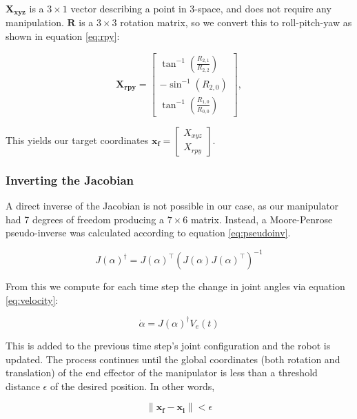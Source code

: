 \documentclass[10pt, conference]{IEEEtran}
\begin{document}
    \(\mathbf{X_{xyz}}\) is a \(3 \times 1\) vector describing a point in
    3-space, and does not require any manipulation. \(\mathbf{R}\) is a \(3
    \times 3\) rotation matrix, so we convert this to roll-pitch-yaw as
    shown in equation \ref{eq:rpy}:

    \begin{equation}
    \label{eq:rpy}
    \mathbf{X_{rpy}} = \begin{bmatrix} \tan^{-1}(\frac{R_{2,1}}{R_{2,2}}) \\
    -\sin^{-1}(R_{2,0}) \\ \tan^{-1}(\frac{R_{1,0}}{R_{0,0}}) \end{bmatrix},
    \end{equation}

    This yields our target coordinates \(\mathbf{x_{f}}
    = \begin{bmatrix}X_{xyz} \\ X_{rpy} \end{bmatrix} \).
\subsubsection{Inverting the Jacobian}
\label{sec-3-4-3}

    A direct inverse of the Jacobian is not possible in our case, as
    our manipulator had 7 degrees of freedom producing a \(7 \times 6\)
    matrix. Instead, a Moore-Penrose pseudo-inverse was calculated
    according to equation \ref{eq:pseudoinv}.

    \begin{equation}
    \label{eq:pseudoinv}
    J(\alpha)^{\dagger} = J(\alpha)^{\top}(J(\alpha)J(\alpha)^{\top})^{-1}
    \end{equation}

    From this we compute for each time step the change in joint angles
    via equation \ref{eq:velocity}:

    \begin{equation}
    \label{eq:velocity}
    \dot{\alpha} = J(\alpha)^{\dagger}V_e(t)
    \end{equation}

    This is added to the previous time step's joint configuration and
    the robot is updated. The process continues until the global
    coordinates (both rotation and translation) of the end effector
    of the manipulator is less than a threshold distance $\epsilon$
    of the desired position. In other words,

    \begin{equation}
    \label{eq:distance}
    \| \mathbf{x_f - x_i} \| < \epsilon
    \end{equation}
\end{document}
